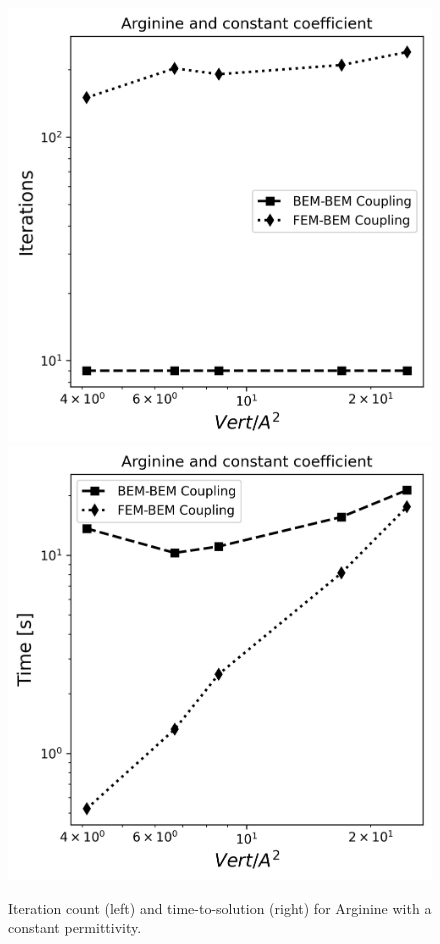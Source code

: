 \begin{figure}
\centering
   \includegraphics[width=0.45\linewidth]{DolfinX_Arginine2_const_coeff_iter.png}
  \includegraphics[width=0.45\linewidth]{DolfinX_Arginine2_const_coeff_total_time.png}
  \caption{Iteration count (left) and time-to-solution (right) for Arginine with a constant permittivity. %
}
\label{fig:arg2_constant_time_iter}
\end{figure}

